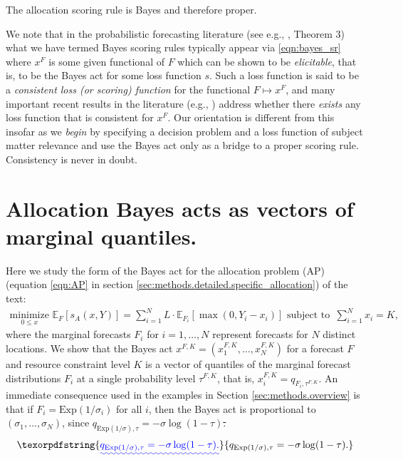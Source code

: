 \documentclass{article}\usepackage[]{graphicx}\usepackage[]{xcolor}
\providecommand{\DIFaddtex}[1]{{\protect\color{blue}\uwave{#1}}} %
\providecommand{\DIFdeltex}[1]{{\protect\color{red}\sout{#1}}}                      %
\providecommand{\DIFaddbegin}{} %
\providecommand{\DIFaddend}{} %
\providecommand{\DIFdelbegin}{} %
\providecommand{\DIFdelend}{} %
\providecommand{\DIFadd}[1]{\texorpdfstring{\DIFaddtex{#1}}{#1}} %
\providecommand{\DIFdel}[1]{\texorpdfstring{\DIFdeltex{#1}}{}} %
\newcommand{\DIFscaledelfig}{0.5}
\newlength{\DIFdelgraphicswidth} %
\newlength{\DIFdelgraphicsheight} %
\newcommand{\DIFaddincludegraphics}[2][]{{\color{blue}\fbox{\DIFOincludegraphics[#1]{#2}}}} %
\newcommand{\DIFdelincludegraphics}[2][]{%
\sbox{\DIFdelgraphicsbox}{\DIFOincludegraphics[#1]{#2}}%
\settoboxwidth{\DIFdelgraphicswidth}{\DIFdelgraphicsbox} %
\settoboxtotalheight{\DIFdelgraphicsheight}{\DIFdelgraphicsbox} %
\scalebox{\DIFscaledelfig}{%
\parbox[b]{\DIFdelgraphicswidth}{\usebox{\DIFdelgraphicsbox}\\[-\baselineskip] \rule{\DIFdelgraphicswidth}{0em}}\llap{\resizebox{\DIFdelgraphicswidth}{\DIFdelgraphicsheight}{%
\setlength{\unitlength}{\DIFdelgraphicswidth}%
\begin{picture}(1,1)%
\thicklines\linethickness{2pt} %
{\color[rgb]{1,0,0}\put(0,0){\framebox(1,1){}}}%
{\color[rgb]{1,0,0}\put(0,0){\line( 1,1){1}}}%
{\color[rgb]{1,0,0}\put(0,1){\line(1,-1){1}}}%
\end{picture}%
}\hspace*{3pt}}} %
} %
\DeclareRobustCommand{\DIFaddbegin}{\DIFOaddbegin \let\includegraphics\DIFaddincludegraphics} %
\DeclareRobustCommand{\DIFaddend}{\DIFOaddend \let\includegraphics\DIFOincludegraphics} %
\DeclareRobustCommand{\DIFdelbegin}{\DIFOdelbegin \let\includegraphics\DIFdelincludegraphics} %
\DeclareRobustCommand{\DIFdelend}{\DIFOaddend \let\includegraphics\DIFOincludegraphics} %
\begin{document}
The allocation scoring rule is Bayes and therefore proper.

We note that in the probabilistic forecasting literature (see e.g., \cite{gneiting2011making}, Theorem 3) what we have
termed Bayes scoring rules typically appear via \eqref{eqn:bayes_sr} where $x^F$ is some given functional of $F$ which
can be shown to be \emph{elicitable}, that is, to be the Bayes act for some loss function $s$. Such a loss function is
said to be a \emph{consistent loss (or scoring) function} for the functional $F \mapsto x^F$, and many important recent
results in the literature (e.g., \cite{fisslerziegel2016consistency}) address whether there \emph{exists} any loss
function that is consistent for $x^F$. Our orientation is different from this insofar as we \emph{begin} by specifying a
decision problem and a loss function of subject matter relevance and use the Bayes act only as a bridge to a proper
scoring rule.  Consistency is never in doubt.

\section{Allocation Bayes acts as vectors of marginal quantiles.}
\label{sec:a:bayes-quantiles}

Here we study the form of the Bayes act for the allocation problem (AP) (equation \eqref{eqn:AP} in section
\ref{sec:methods.detailed.specific_allocation}) of the text:
\begin{align}
    \underset{0 \leq x}{\mathrm{minimize}}\,\, 
    \mathbb{E}_{F} [s_A(x, Y)]= \sum_{i=1}^{N} L \cdot \mathbb{E}_{F_i}[\max(0, Y_i - x_i)]
     \text{ subject to }
     \, \sum_{i=1}^N x_i = K, \label{eqn:AP-long}
\end{align}
where the marginal forecasts $F_i$ for $i=1,\dots,N$ represent forecasts for $N$ distinct locations. We show that the
Bayes act $x^{F,K} = (x_1^{F,K},\ldots,x_N^{F,K})$ for a forecast $F$ and resource constraint level $K$ is a vector of
quantiles of the marginal forecast distributions $F_i$ at a single probability level $\tau^{F,K}$, that is, $x_i^{F,K} =
q_{F_i,\tau^{F,K}}$. An immediate consequence used in the examples in Section \ref {sec:methods.overview} is that if
$F_i = \mathrm{Exp}(1/\sigma_i)$ for all $i$, then the Bayes act is proportional to $(\sigma_1,\ldots,\sigma_N)$, since
\DIFdelbegin \DIFdel{$q_{\mathrm{Exp}(1/\sigma),\tau} = -\sigma \log(1-\tau)$.
}\DIFdelend \DIFaddbegin \begin{align}
\DIFadd{q_{\mathrm{Exp}(1/\sigma),\tau} = -\sigma \log(1-\tau). \label{eqn:exp-quantile}
}\end{align}
\DIFaddend 
\end{document}
